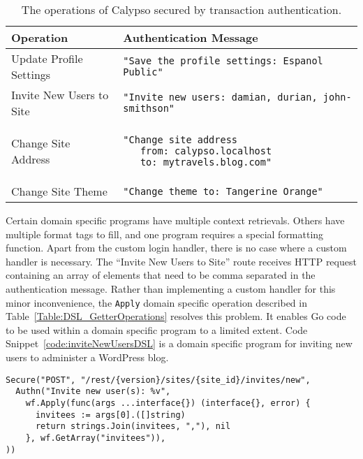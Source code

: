 \begin{table}[h]
\centering

\begin{tabular}{ m{5cm} m{9cm}  } 
 \hline
 Operation & Authentication Message \\ 
 \hline \hline

 Update Profile Settings & \lstinline|"Save the profile settings: Espanol Public"| \\ \hline

 Invite New Users to Site & \lstinline|"Invite new users: damian, durian, john-smithson"| \\ \hline

 Change Site Address & 
 \begin{lstlisting} 
"Change site address
   from: calypso.localhost
   to: mytravels.blog.com"
\end{lstlisting} 
\\ \hline

 Change Site Theme & \lstinline|"Change theme to: Tangerine Orange"| \\ \hline

\end{tabular}
\caption{The operations of Calypso secured by transaction authentication.}
\label{Table:CalypsoSecuredRoutes}
\end{table}

Certain domain specific programs have multiple context retrievals. Others have multiple format tags to fill, and one program requires a special formatting function. Apart from the custom login handler, there is no case where a custom handler is necessary. 
The ``Invite New Users to Site'' route receives HTTP request containing an array of elements that need to be comma separated in the authentication message. Rather than implementing a custom handler for this minor inconvenience, the \lstinline{Apply} domain specific operation described in Table~\ref{Table:DSL_GetterOperations} resolves this problem. It enables Go code to be used within a domain specific program to a limited extent. Code Snippet~\ref{code:inviteNewUsersDSL} is a domain specific program for inviting new users to administer a WordPress blog.


\begin{lstlisting}[float=h,label=code:inviteNewUsersDSL,caption=A domain specific program to secure the Calypso operation for inviting new users to administer a WordPress blog.]
Secure("POST", "/rest/{version}/sites/{site_id}/invites/new", 
  Authn("Invite new user(s): %v",
    wf.Apply(func(args ...interface{}) (interface{}, error) {
      invitees := args[0].([]string)
      return strings.Join(invitees, ","), nil
    }, wf.GetArray("invitees")),
))
\end{lstlisting}

